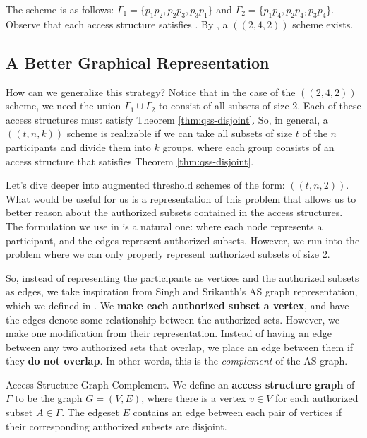 The scheme is as follows: $\Gamma_1 = \{p_1p_2,p_2p_3,p_3p_1\}$ and $\Gamma_2 = \{p_1p_4,p_2p_4,p_3p_4\}$. Observe that each access structure satisfies . By , a $((2,4,2))$ scheme exists.

\subsection{A Better Graphical Representation}

How can we generalize this strategy? Notice that in the case of the $((2,4,2))$ scheme, we need the union $\Gamma_1 \cup \Gamma_2$ to consist of all subsets of size 2. Each of these access structures must satisfy Theorem \ref{thm:qss-disjoint}. So, in general, a $((t,n,k))$ scheme is realizable if we can take all subsets of size $t$ of the $n$ participants and divide them into $k$ groups, where each group consists of an access structure that satisfies Theorem \ref{thm:qss-disjoint}. 

Let's dive deeper into augmented threshold schemes of the form: $((t,n,2))$. What would be useful for us is a representation of this problem that allows us to better reason about the authorized subsets contained in the access structures. The formulation we use in  is a natural one: where each node represents a participant, and the edges represent authorized subsets. However, we run into the problem where we can only properly represent authorized subsets of size 2.

So, instead of representing the participants as vertices and the authorized subsets as edges, we take inspiration from Singh and Srikanth's \cite{singh_assisted_2004} AS graph representation, which we defined in . We \textbf{make each authorized subset a vertex}, and have the edges denote some relationship between the authorized sets. However, we make one modification from their representation. Instead of having an edge between any two authorized sets that overlap, we place an edge between them if they \textbf{do not overlap}. In other words, this is the \textit{complement} of the AS graph.

\begin{definition}{Access Structure Graph Complement.}
    \label{defn:access-structure-graph-complement}
	We define an \textbf{access structure graph} of $\Gamma$ to be the graph $G = (V,E)$, where there is a vertex $v \in V$ for each authorized subset $A \in \Gamma$. The edgeset $E$ contains an edge between each pair of vertices if their corresponding authorized subsets are disjoint.
\end{definition}

